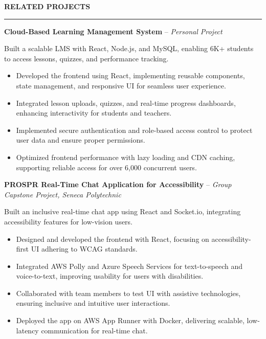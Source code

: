\documentclass[10pt,letterpaper]{article}
\begin{document}
\vspace{6pt}

\textbf{RELATED PROJECTS}\\[-8pt]
\noindent\rule{\textwidth}{1pt}

\vspace{-2pt}

\textbf{Cloud-Based Learning Management System} -- \emph{Personal Project}

\vspace{-1pt}

Built a scalable LMS with React, Node.js, and MySQL, enabling 6K+ students to access lessons, quizzes, and performance tracking.
\vspace{-1pt}
\begin{itemize}
\item Developed the frontend using React, implementing reusable components, state management, and responsive UI for seamless user experience.
\item Integrated lesson uploads, quizzes, and real-time progress dashboards, enhancing interactivity for students and teachers.
\item Implemented secure authentication and role-based access control to protect user data and ensure proper permissions.
\item Optimized frontend performance with lazy loading and CDN caching, supporting reliable access for over 6,000 concurrent users.
\end{itemize}

\textbf{PROSPR  Real-Time Chat Application for Accessibility} -- \emph{Group Capstone Project, Seneca Polytechnic}

\vspace{-1pt}

Built an inclusive real-time chat app using React and Socket.io, integrating accessibility features for low-vision users.
\vspace{-1pt}
\begin{itemize}
\item Designed and developed the frontend with React, focusing on accessibility-first UI adhering to WCAG standards.
\item Integrated AWS Polly and Azure Speech Services for text-to-speech and voice-to-text, improving usability for users with disabilities.
\item Collaborated with team members to test UI with assistive technologies, ensuring inclusive and intuitive user interactions.
\item Deployed the app on AWS App Runner with Docker, delivering scalable, low-latency communication for real-time chat.
\end{itemize}
\end{document}
